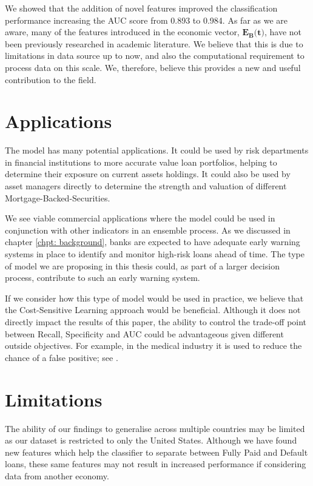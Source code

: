     We showed that the addition of novel features improved the classification performance increasing the AUC score from 0.893 to 0.984. As far as we are aware, many of the features introduced in the economic vector, $\textbf{$\textbf{$\mathbf{E_{B}}$}$(t)}$, have not been previously researched in academic literature. We believe that this is due to limitations in data source up to now, and also the computational requirement to process data on this scale. We, therefore, believe this provides a new and useful contribution to the field. 
    
    
    
   

    \section{Applications}
    
        The model has many potential applications. It could be used by risk departments in financial institutions to more accurate value loan portfolios, helping to determine their exposure on current assets holdings. It could also be used by asset managers directly to determine the strength and valuation of different Mortgage-Backed-Securities. 
        
        We see viable commercial applications where the model could be used in conjunction with other indicators in an ensemble process. As we discussed in chapter \ref{chpt: background}, banks are expected to have adequate early warning systems in place to identify and monitor high-risk loans ahead of time. The type of model we are proposing in this thesis could, as part of a larger decision process, contribute to such an early warning system. 
        
        If we consider how this type of model would be used in practice, we believe that the Cost-Sensitive Learning approach would be beneficial. Although it does not directly impact the results of this paper, the ability to control the trade-off point between Recall, Specificity and AUC could be advantageous given different outside objectives. For example, in the medical industry it is used to reduce the chance of a false positive; see \cite{undersampling_CSL_medical}.    

    \section{Limitations}
        The ability of our findings to generalise across multiple countries may be limited as our dataset is restricted to only the United States. Although we have found new features which help the classifier to separate between Fully Paid and Default loans, these same features may not result in increased performance if considering data from another economy. 
        
